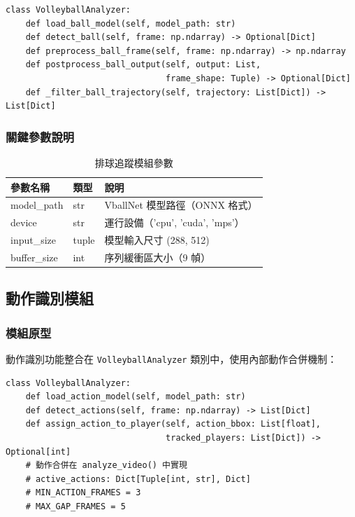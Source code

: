 \documentclass[a4paper,14pt,oneside]{article}
\begin{document}
\begin{lstlisting}[style=pythonstyle, caption=排球追蹤相關方法]
class VolleyballAnalyzer:
    def load_ball_model(self, model_path: str)
    def detect_ball(self, frame: np.ndarray) -> Optional[Dict]
    def preprocess_ball_frame(self, frame: np.ndarray) -> np.ndarray
    def postprocess_ball_output(self, output: List, 
                                frame_shape: Tuple) -> Optional[Dict]
    def _filter_ball_trajectory(self, trajectory: List[Dict]) -> List[Dict]
\end{lstlisting}

\subsubsection{關鍵參數說明}
\begin{table}[H]
    \centering
    \caption{排球追蹤模組參數}
    \begin{tabular}{|l|l|p{6cm}|}
        \hline
        \textbf{參數名稱} & \textbf{類型} & \textbf{說明} \\
        \hline
        model\_path & str & VballNet 模型路徑（ONNX 格式） \\
        \hline
        device & str & 運行設備（'cpu', 'cuda', 'mps'） \\
        \hline
        input\_size & tuple & 模型輸入尺寸 (288, 512) \\
        \hline
        buffer\_size & int & 序列緩衝區大小（9 幀） \\
        \hline
    \end{tabular}
\end{table}

\subsection{動作識別模組}

\subsubsection{模組原型}
動作識別功能整合在 \texttt{VolleyballAnalyzer} 類別中，使用內部動作合併機制：

\begin{lstlisting}[style=pythonstyle, caption=動作識別相關方法]
class VolleyballAnalyzer:
    def load_action_model(self, model_path: str)
    def detect_actions(self, frame: np.ndarray) -> List[Dict]
    def assign_action_to_player(self, action_bbox: List[float], 
                                tracked_players: List[Dict]) -> Optional[int]
    # 動作合併在 analyze_video() 中實現
    # active_actions: Dict[Tuple[int, str], Dict]
    # MIN_ACTION_FRAMES = 3
    # MAX_GAP_FRAMES = 5
\end{lstlisting}
\end{document}
